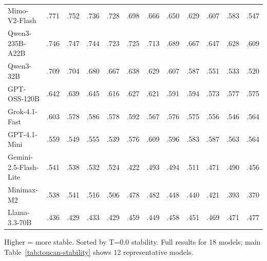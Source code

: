 \documentclass{article}
\theoremstyle{plain}
\theoremstyle{definition}
\begin{document}
\begin{table}[t]
\begin{tabular}{@{}lccccccccccc@{}}
Mimo-V2-Flash & .771 & .752 & .736 & .728 & .698 & .666 & .650 & .629 & .607 & .583 & .547 \\
Qwen3-235B-A22B & .746 & .747 & .744 & .723 & .725 & .713 & .689 & .667 & .647 & .628 & .609 \\
Qwen3-32B & .709 & .704 & .680 & .667 & .638 & .629 & .607 & .587 & .551 & .533 & .520 \\
GPT-OSS-120B & .642 & .639 & .645 & .616 & .627 & .621 & .591 & .594 & .573 & .577 & .575 \\
Grok-4.1-Fast & .603 & .578 & .586 & .578 & .592 & .567 & .576 & .575 & .556 & .546 & .564 \\
GPT-4.1-Mini & .559 & .549 & .555 & .539 & .576 & .609 & .596 & .583 & .587 & .563 & .564 \\
Gemini-2.5-Flash-Lite & .541 & .538 & .532 & .524 & .422 & .493 & .494 & .511 & .471 & .490 & .456 \\
Minimax-M2 & .538 & .541 & .516 & .506 & .478 & .482 & .448 & .440 & .421 & .393 & .370 \\
Llama-3.3-70B & .436 & .429 & .433 & .429 & .459 & .449 & .458 & .451 & .469 & .471 & .477 \\
\bottomrule
\end{tabular}

\vspace{0.5em}
\raggedright\small Higher = more stable. Sorted by T=0.0 stability. Full results for 18 models; main Table~\ref{tab:toucan-stability} shows 12 representative models.
\end{table}
\end{document}
